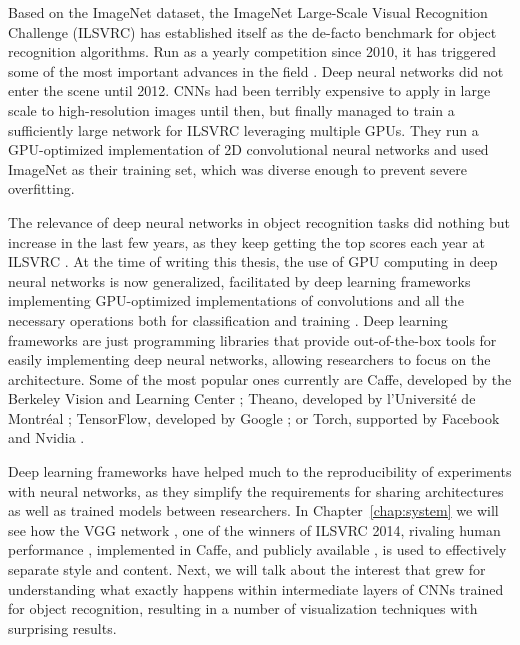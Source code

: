 Based on the ImageNet dataset, the ImageNet Large-Scale Visual Recognition Challenge (ILSVRC) has established itself as the de-facto benchmark for object recognition algorithms.
Run as a yearly competition since 2010, it has triggered some of the most important advances in the field \cite{Russakovsky2015}.
Deep neural networks did not enter the scene until 2012.
CNNs had been terribly expensive to apply in large scale to high-resolution images until then, but \citet{Krizhevsky2012} finally managed to train a sufficiently large network for ILSVRC leveraging multiple GPUs.
They run a GPU-optimized implementation of 2D convolutional neural networks and used ImageNet as their training set, which was diverse enough to prevent severe overfitting.

The relevance of deep neural networks in object recognition tasks did nothing but increase in the last few years, as they keep getting the top scores each year at ILSVRC \cite{Russakovsky2015}.
At the time of writing this thesis, the use of GPU computing in deep neural networks is now generalized, facilitated by deep learning frameworks implementing GPU-optimized implementations of convolutions and all the necessary operations both for classification and training \cite{Bahrampour2015}.
Deep learning frameworks are just programming libraries that provide out-of-the-box tools for easily implementing deep neural networks, allowing researchers to focus on the architecture.
Some of the most popular ones currently are Caffe, developed by the Berkeley Vision and Learning Center \cite{Jia2014}; Theano, developed by l’Université de Montréal \cite{Bergstra2010}; TensorFlow, developed by Google \cite{Abadi2015}; or Torch, supported by Facebook and Nvidia \cite{Collobert2002}.

Deep learning frameworks have helped much to the reproducibility of experiments with neural networks, as they simplify the requirements for sharing architectures as well as trained models between researchers.
In Chapter~\ref{chap:system} we will see how the VGG network \cite{Simonyan2014}, one of the winners of ILSVRC 2014, rivaling human performance \cite{Russakovsky2015}, implemented in Caffe, and publicly available \cite{Simonyan2014web}, is used to effectively separate style and content.
Next, we will talk about the interest that grew for understanding what exactly happens within intermediate layers of CNNs trained for object recognition, resulting in a number of visualization techniques with surprising results.



